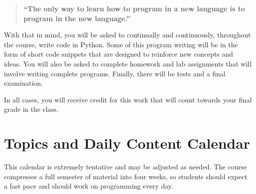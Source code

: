 \documentclass[11pt]{article}
\begin{document}
\begin{quote}
\centering
\textbf{``The only way to learn how to program in a new language is to program in the new language.''}
\end{quote}

With that in mind, you will be asked to continually and continuously, throughout the course, write code in Python. Some of this program writing will be in the form of short code snippets that are designed to reinforce new concepts and ideas. You will also be asked to complete homework and lab assignments that will involve writing complete programs. Finally, there will be tests and a final examination.

In all cases, you will receive credit for this work that will count towards your final grade in the class.

\section{Topics and Daily Content Calendar}

This calendar is extremely tentative and may be adjusted as needed. The course compresses a full semester of material into four weeks, so students should expect a fast pace and should work on programming every day.
\end{document}
